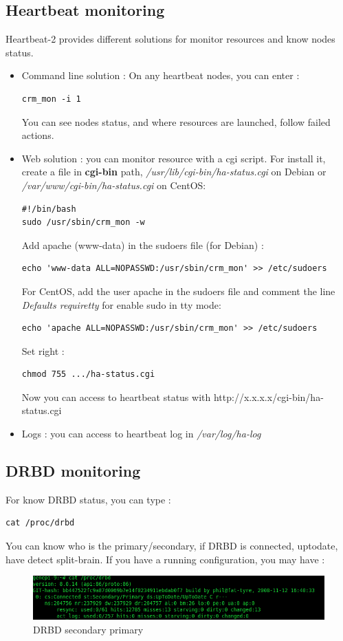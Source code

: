 \documentclass[a4paper,10pt]{report}
\begin{document}
\subsection{Heartbeat monitoring}
\label{hb-monitor}
Heartbeat-2 provides different solutions for monitor resources and know nodes status.
\begin{itemize}
 \item Command line solution : On any heartbeat nodes, you can enter :
\begin{lstlisting}
crm_mon -i 1
\end{lstlisting}
You can see nodes status, and where resources are launched, follow failed actions.
\item Web solution : you can monitor resource with a cgi script. For install it, create a file in \textbf{cgi-bin} path, \textit{/usr/lib/cgi-bin/ha-status.cgi} on Debian or \textit{/var/www/cgi-bin/ha-status.cgi} on CentOS:
\begin{lstlisting}
#!/bin/bash
sudo /usr/sbin/crm_mon -w
\end{lstlisting}
Add apache (www-data) in the sudoers file (for Debian) :
\begin{lstlisting}
echo 'www-data ALL=NOPASSWD:/usr/sbin/crm_mon' >> /etc/sudoers
\end{lstlisting}
For CentOS, add the user apache in the sudoers file and comment the line  \textit{Defaults  requiretty} for enable sudo in tty mode:
\begin{lstlisting}
echo 'apache ALL=NOPASSWD:/usr/sbin/crm_mon' >> /etc/sudoers
\end{lstlisting}
Set right :
\begin{lstlisting}
chmod 755 .../ha-status.cgi
\end{lstlisting}
Now you can access to heartbeat status with http://x.x.x.x/cgi-bin/ha-status.cgi
\item Logs : you can access to heartbeat log in \textit{/var/log/ha-log}

\end{itemize}


\subsection{DRBD monitoring}
For know DRBD status, you can type :\\
\begin{lstlisting}
cat /proc/drbd
\end{lstlisting}


You can know who is the primary/secondary, if DRBD is connected, uptodate, have detect split-brain. If you have a running configuration, you may have :
\begin{figure}[!h]
\begin{center}
\includegraphics[scale=0.5]{schema/drbd-s-p.png}
\end{center}
\caption{DRBD secondary primary} 
\label{drbdstatus} 
\end{figure}
\end{document}
